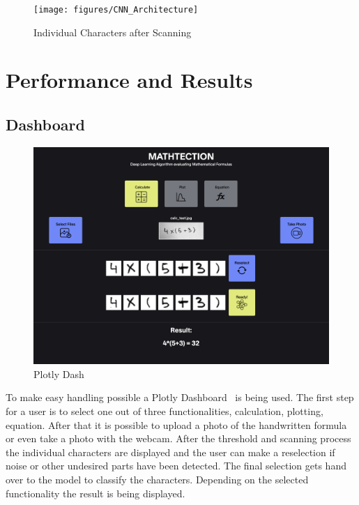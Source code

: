 \documentclass[@CLASSOPTIONS@]{tumarticle}
\begin{document}
\begin{figure}
    \begin{minipage}{0.48\textwidth}
     \centering
     \texttt{[image: figures/CNN\_Architecture]}
     \caption{Individual Characters after Scanning}\label{Fig:CNN_A}
   \end{minipage}
\end{figure}

\section{Performance and Results}
\label{sec:customization}

\subsection{Dashboard}

\begin{figure}
    \begin{minipage}{0.48\textwidth}
     \centering
     \includegraphics[width=.9\linewidth]{figures/dash}
     \caption{Plotly Dash}\label{Fig:Dash}
   \end{minipage}
\end{figure}

To make easy handling possible a Plotly Dashboard~\cite{plotly} is being used.
The first step for a user is to select one out of three functionalities,
calculation, plotting, equation.
After that it is possible to upload a photo of the handwritten formula or even take a photo
with the webcam.
After the threshold and scanning process the individual characters are displayed
and the user can make a reselection if noise or other undesired parts have been detected.
The final selection gets hand over to the model to classify the characters.
Depending on the selected functionality the result is being displayed.
\end{document}
